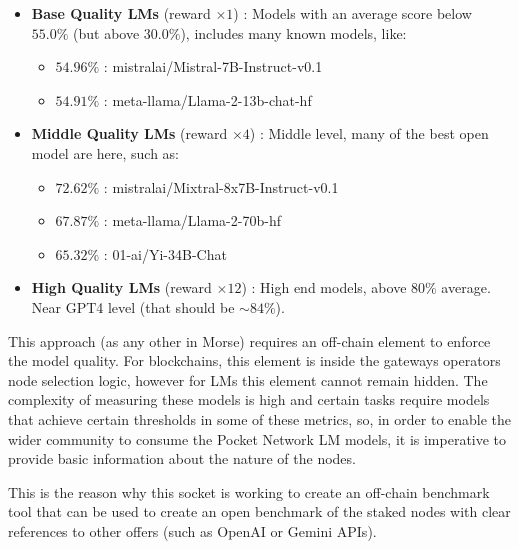 \begin{itemize}
    \item \textbf{Base Quality LMs} (reward $\times 1$) : Models with an average score below $55.0\%$ (but above $30.0\%$), includes many known models, like:
    \begin{itemize}
        \item $54.96\%$ : mistralai/Mistral-7B-Instruct-v0.1
        \item $54.91\%$ : meta-llama/Llama-2-13b-chat-hf
    \end{itemize}
    \item \textbf{Middle Quality LMs} (reward $\times 4$) : Middle level, many of the best open model are here, such as:
    \begin{itemize}
        \item $72.62\%$ : mistralai/Mixtral-8x7B-Instruct-v0.1        
        \item $67.87\%$ : meta-llama/Llama-2-70b-hf
        \item $65.32\%$ : 01-ai/Yi-34B-Chat
    \end{itemize}
    \item \textbf{High Quality LMs} (reward $\times 12$) : High end models, above $80\%$ average. Near GPT4 level (that should be $\sim84\%$).
\end{itemize}

This approach (as any other in Morse) requires an off-chain element to enforce the model quality. For blockchains, this element is inside the gateways operators node selection logic, however for LMs this element cannot remain hidden. The complexity of measuring these models is high and certain tasks require models that achieve certain thresholds in some of these metrics, so, in order to enable the wider community to consume the Pocket Network LM models, it is imperative to provide basic information about the nature of the nodes. 

This is the reason why this socket is working to create an off-chain benchmark tool that can be used to create an open benchmark of the staked nodes with clear references to other offers (such as OpenAI or Gemini APIs).



